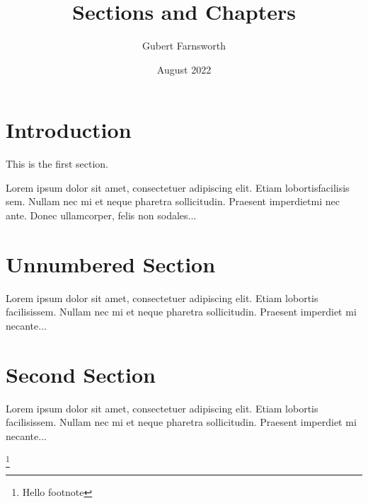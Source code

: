 \documentclass{article}
\title{Sections and Chapters}
\author{Gubert Farnsworth}
\date{August 2022}
\begin{document}
  
\maketitle
  
\tableofcontents

\section{Introduction}
   
This is the first section.
      
Lorem  ipsum  dolor  sit  amet,  consectetuer  adipiscing  
elit.   Etiam  lobortisfacilisis sem.  Nullam nec mi et 
neque pharetra sollicitudin.  Praesent imperdietmi nec ante. 
Donec ullamcorper, felis non sodales...
       
\section*{Unnumbered Section}

Lorem ipsum dolor sit amet, consectetuer adipiscing elit.  
Etiam lobortis facilisissem.  Nullam nec mi et neque pharetra 
sollicitudin.  Praesent imperdiet mi necante...

\section{Second Section}
       
Lorem ipsum dolor sit amet, consectetuer adipiscing elit.  
Etiam lobortis facilisissem.  Nullam nec mi et neque pharetra 
sollicitudin.  Praesent imperdiet mi necante...

\footnote{\label{myfootnote}Hello footnote}
\end{document}

